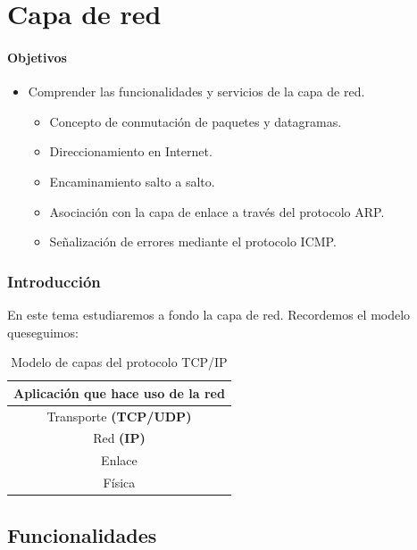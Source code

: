 \chapter{Capa de red}

\subsubsection{Objetivos}

\begin{itemize}
    \item Comprender las funcionalidades y servicios de la capa de red.
        \begin{itemize}
            \item Concepto de conmutación de paquetes y datagramas. 
            \item Direccionamiento en Internet.
            \item Encaminamiento salto a salto.
            \item Asociación con la capa de enlace a través del protocolo \acrshort{ARP}\@.
            \item Señalización de errores mediante el protocolo \acrshort{ICMP}\@.
        \end{itemize}
\end{itemize}

\subsection{Introducción}

En este tema estudiaremos a fondo la capa de red. Recordemos el modelo queseguimos: 

\begin{table}[h]
    \centering
    \begin{tabular}{|c|}
        \hline
        Aplicación que hace uso de la red\\ \hline
        Transporte \textbf{(\acrshort{TCP}/\acrshort{UDP})} \\ \hline
        Red \textbf{(\acrshort{IP})} \\ \hline
        Enlace \\ \hline
        Física \\ \hline
    \end{tabular}
    \caption{Modelo de capas del protocolo TCP/IP}
    \label{table:_tabla_de_capas}
\end{table}



\section{Funcionalidades}

